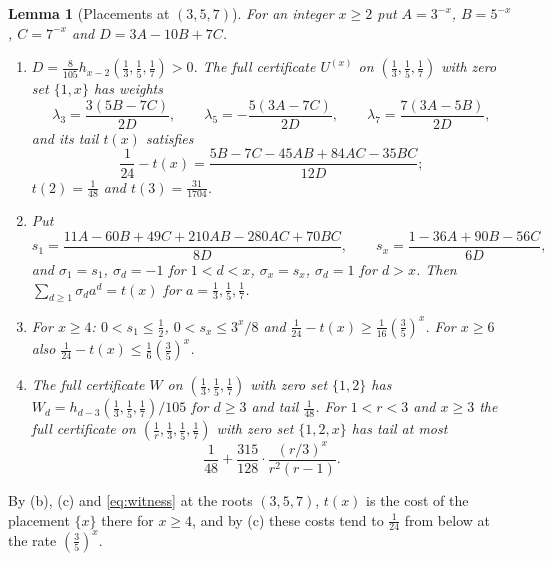 \documentclass[11pt]{article}
\newtheorem{lemma}[theorem]{Lemma}
\begin{document}
\begin{lemma}[Placements at $(3,5,7)$]\label{lem:threenode}
For an integer $x\ge2$ put $A=3^{-x}$, $B=5^{-x}$, $C=7^{-x}$ and
$D=3A-10B+7C$.
\begin{enumerate}
\item[(a)] $D=\tfrac8{105}h_{x-2}(\tfrac13,\tfrac15,\tfrac17)>0$.  The full
certificate $U^{(x)}$ on $(\tfrac13,\tfrac15,\tfrac17)$ with zero set
$\{1,x\}$ has weights
\[
  \lambda_3=\frac{3(5B-7C)}{2D},\qquad
  \lambda_5=-\frac{5(3A-7C)}{2D},\qquad
  \lambda_7=\frac{7(3A-5B)}{2D},
\]
and its tail $t(x)$ satisfies
\[
  \frac1{24}-t(x)=\frac{5B-7C-45AB+84AC-35BC}{12D};
\]
$t(2)=\tfrac1{48}$ and $t(3)=\tfrac{31}{1704}$.
\item[(b)] Put
\[
  s_1=\frac{11A-60B+49C+210AB-280AC+70BC}{8D},\qquad
  s_x=\frac{1-36A+90B-56C}{6D},
\]
and $\sigma_1=s_1$, $\sigma_d=-1$ for $1<d<x$, $\sigma_x=s_x$, $\sigma_d=1$
for $d>x$.  Then $\sum_{d\ge1}\sigma_da^d=t(x)$ for
$a=\tfrac13,\tfrac15,\tfrac17$.
\item[(c)] For $x\ge4$: $0<s_1\le\tfrac12$, $0<s_x\le3^x/8$ and
$\tfrac1{24}-t(x)\ge\tfrac1{16}(\tfrac35)^x$.  For $x\ge6$ also
$\tfrac1{24}-t(x)\le\tfrac16(\tfrac35)^x$.
\item[(d)] The full certificate $W$ on $(\tfrac13,\tfrac15,\tfrac17)$ with
zero set $\{1,2\}$ has $W_d=h_{d-3}(\tfrac13,\tfrac15,\tfrac17)/105$ for
$d\ge3$ and tail $\tfrac1{48}$.  For $1<r<3$ and $x\ge3$ the full
certificate on $(\tfrac1r,\tfrac13,\tfrac15,\tfrac17)$ with zero set
$\{1,2,x\}$ has tail at most
\[
  \frac1{48}+\frac{315}{128}\cdot\frac{(r/3)^x}{r^2(r-1)} .
\]
\end{enumerate}
\end{lemma}

By (b), (c) and \eqref{eq:witness} at the roots $(3,5,7)$, $t(x)$ is the
cost of the placement $\{x\}$ there for $x\ge4$, and by (c) these costs
tend to $\tfrac1{24}$ from below at the rate $(\tfrac35)^x$.
\end{document}
